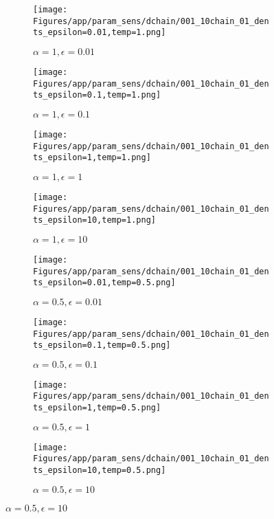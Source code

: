\documentclass{article}
\theoremstyle{plain}
\begin{document}
\begin{appendices}
\begin{figure}
                \begin{subfigure}[b]{0.24\textwidth}
                    \centering
                    \texttt{[image: Figures/app/param\_sens/dchain/001\_10chain\_01\_dents\_epsilon=0.01,temp=1.png]}
                    \caption*{$\alpha=1,\epsilon=0.01$}
                \end{subfigure}
                \begin{subfigure}[b]{0.24\textwidth}
                    \centering
                    \texttt{[image: Figures/app/param\_sens/dchain/001\_10chain\_01\_dents\_epsilon=0.1,temp=1.png]}
                    \caption*{$\alpha=1,\epsilon=0.1$}
                \end{subfigure}
                \begin{subfigure}[b]{0.24\textwidth}
                    \centering
                    \texttt{[image: Figures/app/param\_sens/dchain/001\_10chain\_01\_dents\_epsilon=1,temp=1.png]}
                    \caption*{$\alpha=1,\epsilon=1$}
                \end{subfigure}
                \begin{subfigure}[b]{0.24\textwidth}
                    \centering
                    \texttt{[image: Figures/app/param\_sens/dchain/001\_10chain\_01\_dents\_epsilon=10,temp=1.png]}
                    \caption*{$\alpha=1,\epsilon=10$}
                \end{subfigure}
                
                \begin{subfigure}[b]{0.24\textwidth}
                    \centering
                    \texttt{[image: Figures/app/param\_sens/dchain/001\_10chain\_01\_dents\_epsilon=0.01,temp=0.5.png]}
                    \caption*{$\alpha=0.5,\epsilon=0.01$}
                \end{subfigure}
                \begin{subfigure}[b]{0.24\textwidth}
                    \centering
                    \texttt{[image: Figures/app/param\_sens/dchain/001\_10chain\_01\_dents\_epsilon=0.1,temp=0.5.png]}
                    \caption*{$\alpha=0.5,\epsilon=0.1$}
                \end{subfigure}
                \begin{subfigure}[b]{0.24\textwidth}
                    \centering
                    \texttt{[image: Figures/app/param\_sens/dchain/001\_10chain\_01\_dents\_epsilon=1,temp=0.5.png]}
                    \caption*{$\alpha=0.5,\epsilon=1$}
                \end{subfigure}
                \begin{subfigure}[b]{0.24\textwidth}
                    \centering
                    \texttt{[image: Figures/app/param\_sens/dchain/001\_10chain\_01\_dents\_epsilon=10,temp=0.5.png]}
                    \caption*{$\alpha=0.5,\epsilon=10$}
                \end{subfigure}
                

\end{figure}
\end{appendices}
\end{document}

